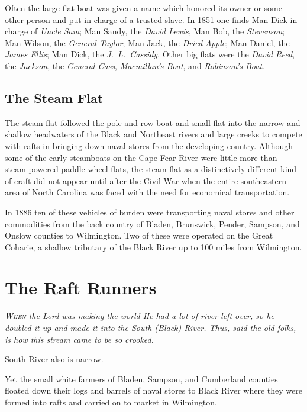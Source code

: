 \documentclass[11pt, a5paper, openright]{book}
\begin{document}
Often the large flat boat was given a name which honored its owner or
some other person and put in charge of a trusted slave.  In 1851 one
finds Man Dick in charge of \textit{Uncle Sam}; Man Sandy, the
\textit{David Lewis}, Man Bob, the \textit{Stevenson}; Man Wilson, the
\textit{General Taylor}; Man Jack, the \textit{Dried Apple}; Man
Daniel, the \textit{James Ellis}; Man Dick, the
\textit{J.~L.~Cassidy}.  Other big flats were the \textit{David Reed},
the \textit{Jackson}, the \textit{General Cass}, \textit{Macmillan's Boat},
and \textit{Robinson's Boat}.\par

\section{The Steam Flat}

The steam flat followed the pole and row boat and small flat into the
narrow and shallow headwaters of the Black and Northeast rivers and
large creeks to compete with rafts in bringing down naval stores from
the developing country.  Although some of the early steamboats on the
Cape Fear River were little more than steam-powered paddle-wheel
flats, the steam flat as a distinctively different kind of craft did
not appear until after the Civil War when the entire southeastern area
of North Carolina was faced with the need for economical
transportation.\par

In 1886 ten of these vehicles of burden were transporting naval stores
and other commodities from the back country of Bladen, Brunswick,
Pender, Sampson, and Onslow counties to Wilmington.  Two of these were
operated on the Great Coharie, a shallow tributary of the Black River
up to 100 miles from Wilmington.  \citep[8-13-86]{ws}\par


\chapter{The Raft Runners}

\textit{\textsc{When} the Lord was making the world He had a lot of
  river left over, so he doubled it up and made it into the South
  (Black) River.  Thus, said the old folks, is how this stream came to
  be so crooked.}  \citep{shawg}\par

South River also is narrow.\par

Yet the small white farmers of Bladen, Sampson, and Cumberland
counties floated down their logs and barrels of naval stores to Black
River where they were formed into rafts and carried on to market in
Wilmington.\par
\end{document}
